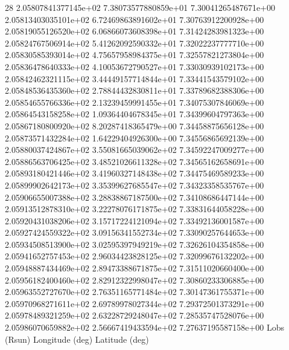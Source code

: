           28
   2.05807841377145e+02   7.38073577880859e+01   7.30041265487671e+00
   2.05813403035101e+02   6.72469863891602e+01   7.30763912200928e+00
   2.05819055126520e+02   6.06866073608398e+01   7.31424283981323e+00
   2.05824767506914e+02   5.41262092590332e+01   7.32022237777710e+00
   2.05830585393014e+02   4.75657958984375e+01   7.32557821273804e+00
   2.05836478640333e+02   4.10053672790527e+01   7.33030939102173e+00
   2.05842462321115e+02   3.44449157714844e+01   7.33441543579102e+00
   2.05848536435360e+02   2.78844432830811e+01   7.33789682388306e+00
   2.05854655766336e+02   2.13239459991455e+01   7.34075307846069e+00
   2.05864543158258e+02   1.09364404678345e+01   7.34399604797363e+00
   2.05867180800920e+02   8.20287418365479e+00   7.34458875656128e+00
   2.05873571432284e+02   1.64229404926300e+00   7.34556865692139e+00
   2.05880037424867e+02   3.55081665039062e+02   7.34592247009277e+00
   2.05886563706425e+02   3.48521026611328e+02   7.34565162658691e+00
   2.05893180421446e+02   3.41960327148438e+02   7.34475469589233e+00
   2.05899902642173e+02   3.35399627685547e+02   7.34323358535767e+00
   2.05906655007388e+02   3.28838867187500e+02   7.34108686447144e+00
   2.05913512878310e+02   3.22278076171875e+02   7.33831644058228e+00
   2.05920431038206e+02   3.15717224121094e+02   7.33492136001587e+00
   2.05927424559322e+02   3.09156341552734e+02   7.33090257644653e+00
   2.05934508513900e+02   3.02595397949219e+02   7.32626104354858e+00
   2.05941652757453e+02   2.96034423828125e+02   7.32099676132202e+00
   2.05948887434469e+02   2.89473388671875e+02   7.31511020660400e+00
   2.05956182400460e+02   2.82912322998047e+02   7.30860233306885e+00
   2.05963552727670e+02   2.76351165771484e+02   7.30147361755371e+00
   2.05970968271611e+02   2.69789978027344e+02   7.29372501373291e+00
   2.05978489321259e+02   2.63228729248047e+02   7.28535747528076e+00
   2.05986070659882e+02   2.56667419433594e+02   7.27637195587158e+00
Lobs (Rsun)    Longitude (deg)   Latitude (deg)
